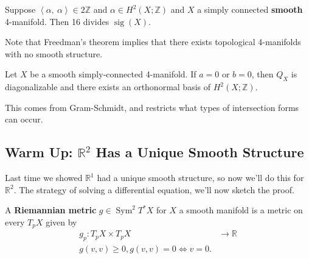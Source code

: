 \begin{theorem}

Suppose
\({\left\langle { \alpha},~{\alpha} \right\rangle} \in 2{\mathbb{Z}}\)
and \(\alpha\in H^2(X; {\mathbb{Z}})\) and \(X\) a simply connected
\textbf{smooth} 4-manifold. Then 16 divides \(\operatorname{sig}(X)\).

\end{theorem}

\begin{remark}

Note that Freedman's theorem implies that there exists topological
4-manifolds with no smooth structure.

\end{remark}

\begin{theorem}[Donaldson]

Let \(X\) be a smooth simply-connected 4-manifold. If \(a=0\) or
\(b=0\), then \(Q_X\) is diagonalizable and there exists an orthonormal
basis of \(H^2(X; {\mathbb{Z}})\).

\end{theorem}

\begin{remark}

This comes from Gram-Schmidt, and restricts what types of intersection
forms can occur.

\end{remark}

\hypertarget{warm-up-mathbbr2-has-a-unique-smooth-structure}{%
\subsection{\texorpdfstring{Warm Up: \({\mathbb{R}}^2\) Has a Unique
Smooth
Structure}{Warm Up: \{\textbackslash mathbb\{R\}\}\^{}2 Has a Unique Smooth Structure}}\label{warm-up-mathbbr2-has-a-unique-smooth-structure}}

\begin{remark}

Last time we showed \({\mathbb{R}}^1\) had a unique smooth structure, so
now we'll do this for \({\mathbb{R}}^2\). The strategy of solving a
differential equation, we'll now sketch the proof.

\end{remark}

\begin{definition}

A \textbf{Riemannian metric} \(g\in \operatorname{Sym}^2 T^*X\) for
\(X\) a smooth manifold is a metric on every \(T_p X\) given by
\begin{align*}
g_p: T_pX \times T_p X &\to {\mathbb{R}}\\
g(v, v) \geq 0, g(v,v) = 0 \iff v=0
.\end{align*}

\end{definition}

